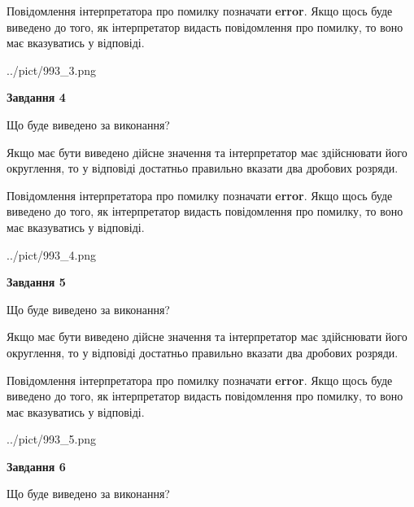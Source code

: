 \documentclass[12pt, ukrainian]{article}
\begin{document}
{\begin {Large}
Повідомлення інтерпретатора про помилку позначати \textbf{error}.
Якщо щось буде виведено до того, як інтерпретатор видасть повідомлення про помилку, 
то воно має вказуватись у відповіді. \par

\begin{center}
	{../pict/993_3.png}
\end{center}
\newpage

{\begin {center}\textbf{Завдання 4}\end {center}}\par
Що буде виведено за виконання? \par

Якщо має бути виведено дійсне значення та інтерпретатор має здійснювати його округлення, 
то у відповіді достатньо правильно вказати два дробових розряди.

Повідомлення інтерпретатора про помилку позначати \textbf{error}.
Якщо щось буде виведено до того, як інтерпретатор видасть повідомлення про помилку, 
то воно має вказуватись у відповіді. \par

\begin{center}
	{../pict/993_4.png}
\end{center}
\newpage

{\begin {center}\textbf{Завдання 5}\end {center}}\par
Що буде виведено за виконання? \par

Якщо має бути виведено дійсне значення та інтерпретатор має здійснювати його округлення, 
то у відповіді достатньо правильно вказати два дробових розряди.

Повідомлення інтерпретатора про помилку позначати \textbf{error}.
Якщо щось буде виведено до того, як інтерпретатор видасть повідомлення про помилку, 
то воно має вказуватись у відповіді. \par

\begin{center}
	{../pict/993_5.png}
\end{center}
\newpage

{\begin {center}\textbf{Завдання 6}\end {center}}\par
Що буде виведено за виконання? \par


\end{Large}}
\end{document}
